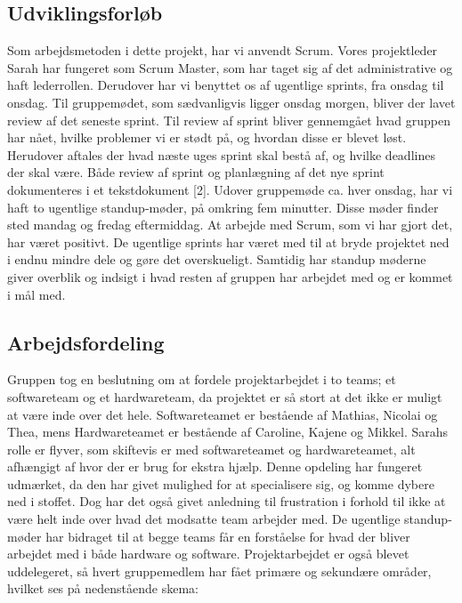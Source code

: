 \subsection{Udviklingsforløb}
Som arbejdsmetoden i dette projekt, har vi anvendt Scrum. Vores projektleder Sarah har fungeret som Scrum Master, som har taget sig af det administrative og haft lederrollen. Derudover har vi benyttet os af ugentlige sprints, fra onsdag til onsdag. Til gruppemødet, som sædvanligvis ligger onsdag morgen, bliver der lavet review af det seneste sprint. Til review af sprint bliver gennemgået hvad gruppen har nået, hvilke problemer vi er stødt på, og hvordan disse er blevet løst. Herudover aftales der hvad næste uges sprint skal bestå af, og hvilke deadlines der skal være. Både review af sprint og planlægning af det nye sprint dokumenteres i et tekstdokument [2]. Udover gruppemøde ca. hver onsdag, har vi haft to ugentlige standup-møder, på omkring fem minutter. Disse møder finder sted mandag og fredag eftermiddag.
At arbejde med Scrum, som vi har gjort det, har været positivt. De ugentlige sprints har været med til at bryde projektet ned i endnu mindre dele og gøre det overskueligt. Samtidig har standup møderne giver overblik og indsigt i hvad resten af gruppen har arbejdet med og er kommet i mål med.

\subsection{Arbejdsfordeling}
Gruppen tog en beslutning om at fordele projektarbejdet i to teams; et softwareteam og et hardwareteam, da projektet er så stort at det ikke er muligt at være inde over det hele. Softwareteamet er bestående af Mathias, Nicolai og Thea, mens Hardwareteamet er bestående af Caroline, Kajene og Mikkel. Sarahs rolle er flyver, som skiftevis er med softwareteamet og hardwareteamet, alt afhængigt af hvor der er brug for ekstra hjælp.
Denne opdeling har fungeret udmærket, da den har givet mulighed for at specialisere sig, og komme dybere ned i stoffet. Dog har det også givet anledning til frustration i forhold til ikke at være helt inde over hvad det modsatte team arbejder med. De ugentlige standup-møder har bidraget til at begge teams får en forståelse for hvad der bliver arbejdet med i både hardware og software.
Projektarbejdet er også blevet uddelegeret, så hvert gruppemedlem har fået primære og sekundære områder, hvilket ses på nedenstående skema:

















